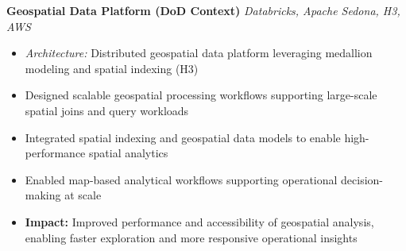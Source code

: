 \textbf{Geospatial Data Platform (DoD Context)} \hfill {\small\textit{Databricks, Apache Sedona, H3, AWS}}
\begin{itemize}
	\item \textit{Architecture:} Distributed geospatial data platform leveraging medallion modeling and spatial indexing (H3)
	\item Designed scalable geospatial processing workflows supporting large-scale spatial joins and query workloads
	\item Integrated spatial indexing and geospatial data models to enable high-performance spatial analytics
	\item Enabled map-based analytical workflows supporting operational decision-making at scale
	\item \textbf{Impact:} Improved performance and accessibility of geospatial analysis, enabling faster exploration and more responsive operational insights
\end{itemize}